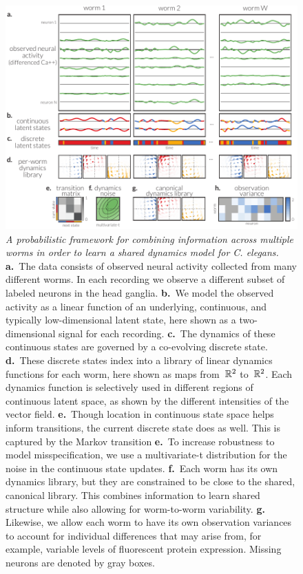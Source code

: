 \documentclass[11pt]{article}
\newcommand{\celegans}{\textit{C. elegans}}
\begin{document}
\begin{figure}[t!]
\centering%
\includegraphics[width=6in]{figures/v3/figure1} 
\caption{
  \textit{A probabilistic framework for combining
  information across multiple worms in order to learn a shared
  dynamics model for \celegans.}
  \textbf{a.}~The data consists of observed neural activity collected
  from many different worms.  In each recording we observe a different
  subset of labeled neurons in the head ganglia.
  \textbf{b.}~We model the observed activity as a linear function of
  an underlying, continuous, and typically low-dimensional latent state,
  here shown as a two-dimensional signal for each recording.
  \textbf{c.}~The dynamics of these continuous states are governed by
  a co-evolving discrete state.
  \textbf{d.}~These discrete states index into a library of linear
  dynamics functions for each worm, here shown as maps from~$\mathbb{R}^2$ to~$\mathbb{R}^2$.
  Each dynamics function is selectively used in different regions of
  continuous latent space, as shown by the different intensities of
  the vector field.
  \textbf{e.}~Though location in continuous state space helps inform
  transitions, the current discrete state does as well. This is captured
  by the Markov transition
  \textbf{e.}~To increase robustness to model misspecification, we
  use a multivariate-t distribution for the noise in the continuous
  state updates.
  \textbf{f.}~Each worm has its own dynamics library, but they are
  constrained to be close to the shared, canonical library.  This
  combines information to learn shared structure while also allowing
  for worm-to-worm variability.
  \textbf{g.} Likewise, we allow each worm to have its own observation
  variances to account for individual differences that may arise from,
  for example, variable levels of fluorescent protein expression.
  Missing neurons are denoted by gray boxes. 
}
\label{fig:model}
\end{figure}
\end{document}
